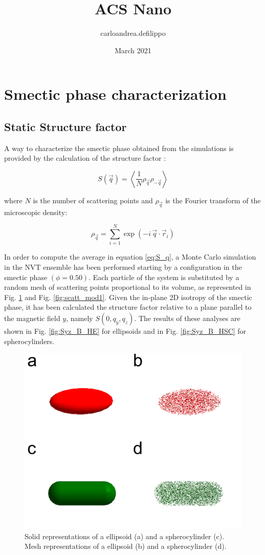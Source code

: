 \documentclass{article}
\title{ACS Nano}
\author{carloandrea.defilippo }
\date{March 2021}
\begin{document}
\maketitle

\section{Smectic phase characterization}

\subsection{Static Structure factor}

A way to characterize the smectic phase obtained from the simulations is provided by the calculation of the structure factor \cite{Hansen_McDonald}:

\begin{equation}\label{eq:S_q}
    S( \vec{q} ) = \left\langle \frac{1}{N} \rho_{\vec{q}} \rho_{-\vec{q}} \right\rangle 
\end{equation}

where $N$ is the number of scattering points and $\rho_{\vec{q}}$ is the Fourier transform of the microscopic density:

\begin{equation}
    \rho_{\vec{q}} = \sum_{i=1}^N \exp(-i\, \vec{q} \cdot \vec{r}_i)
\end{equation}

In order to compute the average in equation \ref{eq:S_q}, a Monte Carlo simulation in the NVT ensemble has been performed starting by a configuration in the smectic phase $(\phi = 0.50)$. Each particle of the system is substituted by a random mesh of scattering points proportional to its volume, as represented in Fig. \ref{fig:scatt_mod_single} and Fig. \ref{fig:scatt_mod1}. Given the in-plane 2D isotropy of the smectic phase, it has been calculated the structure factor relative to a plane parallel to the magnetic field $y$, namely $S(0, q_y, q_z)$. The results of these analyses are shown in Fig. \ref{fig:Syz_B_HE} for ellipsoids and in Fig. \ref{fig:Syz_B_HSC} for spherocylinders.

\begin{figure}
    \centering
    \includegraphics[width=0.5\columnwidth]{Scatteringmodel_single.png}
    \caption{Solid representations of a ellipsoid (a) and a spherocylinder (c). Mesh representations of a ellipsoid (b) and a spherocylinder (d).}
    \label{fig:scatt_mod_single}
\end{figure}
\end{document}
